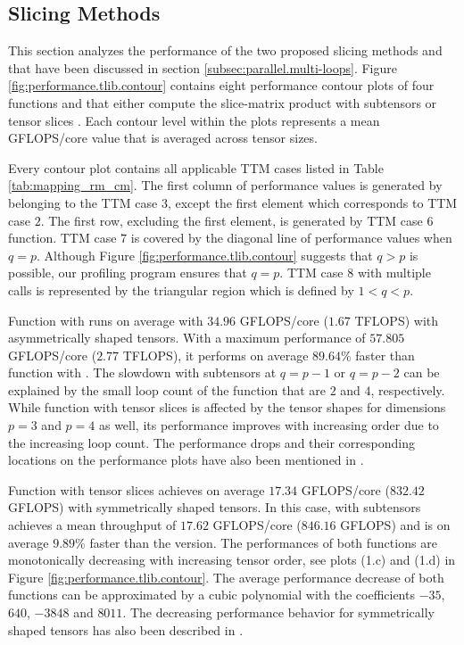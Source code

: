 \subsection{Slicing Methods}
This section analyzes the performance of the two proposed slicing methods  and  that have been discussed in section \ref{subsec:parallel.multi-loops}.
Figure \ref{fig:performance.tlib.contour} contains eight performance contour plots of four  functions  and  that either compute the slice-matrix product with subtensors  or tensor slices .
Each contour level within the plots represents a mean GFLOPS/core value that is averaged across tensor sizes.

Every contour plot contains all applicable TTM cases listed in Table \ref{tab:mapping_rm_cm}.
The first column of performance values is generated by  belonging to the TTM case $3$, except the first element which corresponds to TTM case $2$.
The first row, excluding the first element, is generated by TTM case $6$ function.
TTM case $7$ is covered by the diagonal line of performance values when $q = p$.  
Although Figure \ref{fig:performance.tlib.contour} suggests that $q>p$ is possible, our profiling program ensures that $q=p$.
TTM case $8$ with multiple  calls is represented by the triangular region which is defined by $1<q<p$.


Function  with  runs on average with $34.96$ GFLOPS/core ($1.67$ TFLOPS) with asymmetrically shaped tensors.
With a maximum performance of $57.805$ GFLOPS/core ($2.77$ TFLOPS), it performs on average $89.64$\% faster than function  with .
The slowdown with subtensors at $q=p-1$ or $q=p-2$ can be explained by the small loop count of the function that are $2$ and $4$, respectively.
While function  with tensor slices is affected by the tensor shapes for dimensions $p=3$ and $p=4$ as well, its performance improves with increasing order due to the increasing loop count.
The performance drops and their corresponding locations on the performance plots have also been mentioned in \cite{bassoy:2024:ttm}.


Function  with tensor slices achieves on average $17.34$ GFLOPS/core ($832.42$ GFLOPS) with symmetrically shaped tensors.
In this case,  with subtensors achieves a mean throughput of $17.62$ GFLOPS/core ($846.16$ GFLOPS) and is on average $9.89$\% faster than the  version.
The performances of both functions are monotonically decreasing with increasing tensor order, see plots (1.c) and (1.d) in Figure \ref{fig:performance.tlib.contour}.
The average performance decrease of both functions can be approximated by a cubic polynomial with the coefficients $-35$, $640$, $-3848$ and $8011$.
The decreasing performance behavior for symmetrically shaped tensors has also been described in \cite{bassoy:2024:ttm}.

